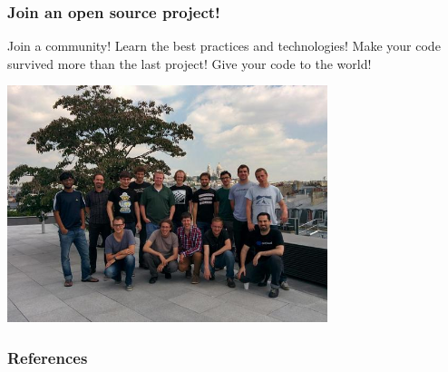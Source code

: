 \documentclass[11pt,compress,serif]{beamer}
\begin{document}
\begin{frame}[fragile=singleslide]
\frametitle{Join an open source project!}

Join a community! Learn the best practices and technologies! 
Make your code survived more than the last project! Give your
code to the world!

\begin{center}
\includegraphics[width=0.7\textwidth]{scikit-learn-sprint.jpg}

\begin{small}
\end{small}
\end{center}

    
\end{frame}



\begin{frame}[allowframebreaks]%
\frametitle{References} 

{\footnotesize
    
    
}
\end{frame}
\end{document}
